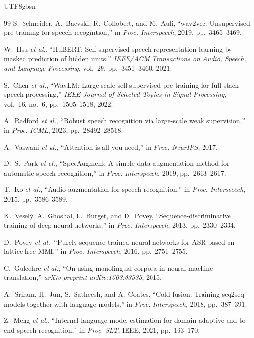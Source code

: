 \documentclass[12pt,a4paper]{article}
\newcommand{\etal}{\textit{et al.}}
\begin{document}
\begin{CJK}{UTF8}{gbsn}
\begin{thebibliography}{99}
S.~Schneider, A.~Baevski, R.~Collobert, and M.~Auli,
``wav2vec: Unsupervised pre-training for speech recognition,''
in \textit{Proc. Interspeech}, 2019, pp.~3465--3469.

W.~Hsu \etal,
``HuBERT: Self-supervised speech representation learning by masked prediction of hidden units,''
\textit{IEEE/ACM Transactions on Audio, Speech, and Language Processing}, vol.~29, pp.~3451--3460, 2021.

S.~Chen \etal,
``WavLM: Large-scale self-supervised pre-training for full stack speech processing,''
\textit{IEEE Journal of Selected Topics in Signal Processing}, vol.~16, no.~6, pp.~1505--1518, 2022.

A.~Radford \etal,
``Robust speech recognition via large-scale weak supervision,''
in \textit{Proc. ICML}, 2023, pp.~28492--28518.

A.~Vaswani \etal,
``Attention is all you need,''
in \textit{Proc. NeurIPS}, 2017.

D.~S.~Park \etal,
``SpecAugment: A simple data augmentation method for automatic speech recognition,''
in \textit{Proc. Interspeech}, 2019, pp.~2613--2617.

T.~Ko \etal,
``Audio augmentation for speech recognition,''
in \textit{Proc. Interspeech}, 2015, pp.~3586--3589.

K.~Vesel\'{y}, A.~Ghoshal, L.~Burget, and D.~Povey,
``Sequence-discriminative training of deep neural networks,''
in \textit{Proc. Interspeech}, 2013, pp.~2330--2334.

D.~Povey \etal,
``Purely sequence-trained neural networks for ASR based on lattice-free MMI,''
in \textit{Proc. Interspeech}, 2016, pp.~2751--2755.

C.~Gulcehre \etal,
``On using monolingual corpora in neural machine translation,''
\textit{arXiv preprint arXiv:1503.03535}, 2015.

A.~Sriram, H.~Jun, S.~Satheesh, and A.~Coates,
``Cold fusion: Training seq2seq models together with language models,''
in \textit{Proc. Interspeech}, 2018, pp.~387--391.

Z.~Meng \etal,
``Internal language model estimation for domain-adaptive end-to-end speech recognition,''
in \textit{Proc. SLT}, IEEE, 2021, pp.~163--170.


\end{thebibliography}
\end{CJK}
\end{document}
